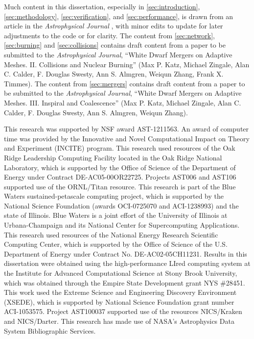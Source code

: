 \documentclass[12pt]{article}
\begin{document}
Much content in this dissertation, especially in \autoref{sec:introduction},
\autoref{sec:methodology}, \autoref{sec:verification}, and \autoref{sec:performance},
is drawn from an article in the \textit{Astrophysical Journal} \citep{wdmergerI},
with minor edits to update for later adjustments to the code or for clarity. The content
from \autoref{sec:network}, \autoref{sec:burning} and \autoref{sec:collisions} contains draft content from
a paper to be submitted to the \textit{Astrophysical Journal}, ``White Dwarf Mergers on
Adaptive Meshes. II. Collisions and Nuclear Burning'' (Max P. Katz, Michael Zingale,
Alan C. Calder, F. Douglas Swesty, Ann S. Almgren, Weiqun Zhang, Frank X. Timmes).
The content from \autoref{sec:mergers} contains draft content from a paper to be
submitted to the \textit{Astrophysical Journal}, ``White Dwarf Mergers on Adaptive
Meshes. III. Inspiral and Coalescence'' (Max P. Katz, Michael Zingale, Alan C. Calder,
F. Douglas Swesty, Ann S. Almgren, Weiqun Zhang).

This research was supported by NSF award AST-1211563. An
award of computer time was provided by the Innovative and Novel
Computational Impact on Theory and Experiment (INCITE) program.  This
research used resources of the Oak Ridge Leadership Computing Facility
located in the Oak Ridge National Laboratory, which is supported by
the Office of Science of the Department of Energy under Contract
DE-AC05-00OR22725. Projects AST006 and AST106 supported use of the ORNL/Titan resource.
This research is part of the Blue Waters sustained-petascale computing project,
which is supported by the National Science Foundation (awards OCI-0725070
and ACI-1238993) and the state of Illinois. Blue Waters is a joint
effort of the University of Illinois at Urbana-Champaign and its
National Center for Supercomputing Applications.
This research used resources of the National Energy Research Scientific Computing
Center, which is supported by the Office of Science of the
U.S. Department of Energy under Contract No. DE-AC02-05CH11231.
Results in this dissertation were obtained using the high-performance
LIred computing system at the Institute for Advanced Computational
Science at Stony Brook University, which was obtained through
the Empire State Development grant NYS \#28451.
This work used the Extreme Science and Engineering Discovery Environment (XSEDE),
which is supported by National Science Foundation grant number ACI-1053575.
Project AST100037 supported use of the resources NICS/Kraken and NICS/Darter.
This research has made use of NASA's Astrophysics Data System
Bibliographic Services.
\end{document}
